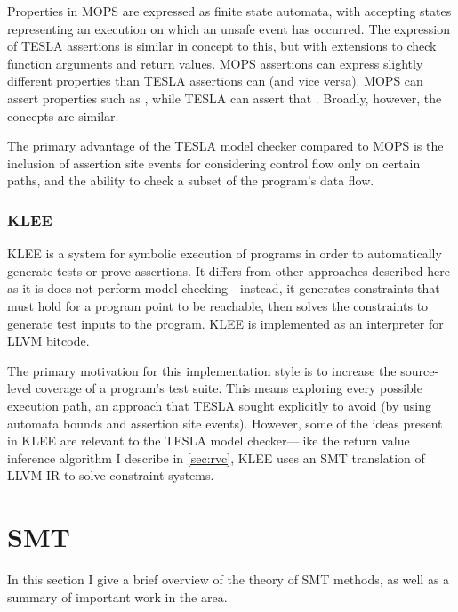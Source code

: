 Properties in MOPS are expressed as finite state automata, with accepting states
representing an execution on which an unsafe event has occurred. The expression
of TESLA assertions is similar in concept to this, but with extensions to check
function arguments and return values. MOPS assertions can express slightly
different properties than TESLA assertions can (and vice versa). MOPS can assert
properties such as , while TESLA can assert that
. Broadly, however, the concepts are similar.

The primary advantage of the TESLA model checker compared to MOPS is the
inclusion of assertion site events for considering control flow only on certain
paths, and the ability to check a subset of the program's data flow.

\subsubsection{KLEE}

KLEE \cite{cadar_klee:_2008} is a system for symbolic execution of programs in
order to automatically generate tests or prove assertions. It differs from other
approaches described here as it is does not perform model checking---instead, it
generates constraints that must hold for a program point to be reachable, then
solves the constraints to generate test inputs to the program. KLEE is
implemented as an interpreter for LLVM bitcode.

The primary motivation for this implementation style is to increase the
source-level coverage of a program's test suite. This means exploring every
possible execution path, an approach that TESLA sought explicitly to avoid (by
using automata bounds and assertion site events). However, some of the ideas
present in KLEE are relevant to the TESLA model checker---like the return value
inference algorithm I describe in \autoref{sec:rvc}, KLEE uses an SMT
translation of LLVM IR to solve constraint systems.

\section{SMT} \label{sec:smt}

In this section I give a brief overview of the theory of SMT methods, as well as
a summary of important work in the area.

